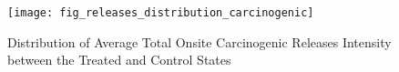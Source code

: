 \begin{figure}[H]
    \centering
    \texttt{[image: fig\_releases\_distribution\_carcinogenic]}
    \caption{Distribution of Average Total Onsite Carcinogenic Releases Intensity between the Treated and Control States}
    \label{fig:releases-distribution-carcinogenic}
\end{figure}